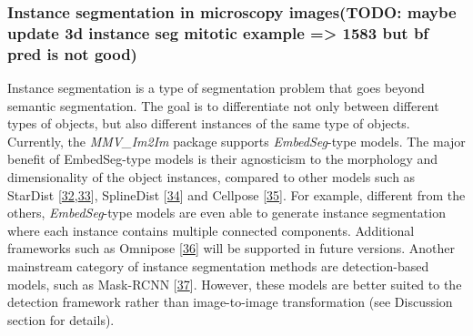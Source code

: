 \hypertarget{instance-segmentation-in-microscopy-imagestodo-maybe-update-3d-instance-seg-mitotic-example-1583-but-bf-pred-is-not-good}{%
\subsubsection{Instance segmentation in microscopy images(TODO: maybe update 3d instance seg mitotic example =\textgreater{} 1583 but bf pred is not good)}\label{instance-segmentation-in-microscopy-imagestodo-maybe-update-3d-instance-seg-mitotic-example-1583-but-bf-pred-is-not-good}}

Instance segmentation is a type of segmentation problem that goes beyond semantic segmentation. The goal is to differentiate not only between different types of objects, but also different instances of the same type of objects. Currently, the \emph{MMV\_Im2Im} package supports \emph{EmbedSeg}-type models. The major benefit of EmbedSeg-type models is their agnosticism to the morphology and dimensionality of the object instances, compared to other models such as StarDist {[}\protect\hyperlink{ref-tIIG2f8K}{32},\protect\hyperlink{ref-14h90Vfg0}{33}{]}, SplineDist {[}\protect\hyperlink{ref-17Yrl6WGQ}{34}{]} and Cellpose {[}\protect\hyperlink{ref-TugPkOLy}{35}{]}. For example, different from the others, \emph{EmbedSeg}-type models are even able to generate instance segmentation where each instance contains multiple connected components. Additional frameworks such as Omnipose {[}\protect\hyperlink{ref-lXzmjM5n}{36}{]} will be supported in future versions. Another mainstream category of instance segmentation methods are detection-based models, such as Mask-RCNN {[}\protect\hyperlink{ref-xi8wnibR}{37}{]}. However, these models are better suited to the detection framework rather than image-to-image transformation (see Discussion section for details).

